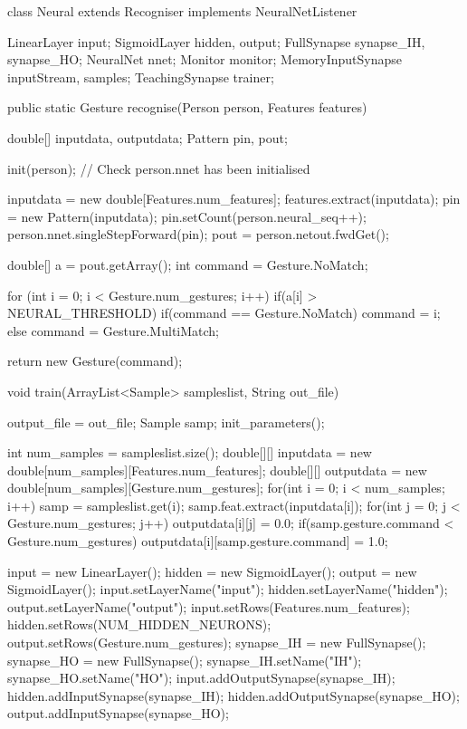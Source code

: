 \documentclass[12pt,a4,notitlepage]{report}
\renewcommand{\_}{\texttt{\symbol{95}}}
\newcommand{\<}{\texttt{\symbol{60}}}
\renewcommand{\>}{\texttt{\symbol{62}}}
\begin{document}
\begin{code}
class Neural extends Recogniser implements NeuralNetListener 
{
   LinearLayer input;
   SigmoidLayer hidden, output;
   FullSynapse synapse_IH, synapse_HO;
   NeuralNet nnet;
   Monitor monitor;
   MemoryInputSynapse inputStream, samples;
   TeachingSynapse trainer;
   
   public static Gesture recognise(Person person, Features features)
   {     
      double[] inputdata, outputdata;
      Pattern pin, pout;
      
      init(person); // Check person.nnet has been initialised

      inputdata = new double[Features.num_features];
      features.extract(inputdata);
      pin = new Pattern(inputdata);
      pin.setCount(person.neural_seq++);
      person.nnet.singleStepForward(pin);
      pout = person.netout.fwdGet();
            
      double[] a = pout.getArray();
      int command = Gesture.NoMatch;
            
      for (int i = 0; i < Gesture.num_gestures; i++)
      {
         if(a[i] > NEURAL_THRESHOLD)
         {
            if(command == Gesture.NoMatch)
               command = i;
            else
               command = Gesture.MultiMatch;
         }
      }
      
      return new Gesture(command);

   }
      
   void train(ArrayList<Sample> sampleslist, String out_file)
   {

      output_file = out_file;
      Sample samp;
      init_parameters();
      
      int num_samples = sampleslist.size();
      double[][] inputdata = new double[num_samples][Features.num_features];
      double[][] outputdata = new double[num_samples][Gesture.num_gestures];
      for(int i = 0; i < num_samples; i++)
      {
         samp = sampleslist.get(i);
         samp.feat.extract(inputdata[i]);
         for(int j = 0; j < Gesture.num_gestures; j++)
            outputdata[i][j] = 0.0;
         if(samp.gesture.command < Gesture.num_gestures)
            outputdata[i][samp.gesture.command] = 1.0;
      }
      
      input = new LinearLayer();
      hidden = new SigmoidLayer();
      output = new SigmoidLayer();
      input.setLayerName("input");
      hidden.setLayerName("hidden");
      output.setLayerName("output");
      input.setRows(Features.num_features);
      hidden.setRows(NUM_HIDDEN_NEURONS);
      output.setRows(Gesture.num_gestures);
      synapse_IH = new FullSynapse();
      synapse_HO = new FullSynapse();
      synapse_IH.setName("IH");
      synapse_HO.setName("HO");
      input.addOutputSynapse(synapse_IH);
      hidden.addInputSynapse(synapse_IH);
      hidden.addOutputSynapse(synapse_HO);
      output.addInputSynapse(synapse_HO);
      
}}
\end{code}
\end{document}
